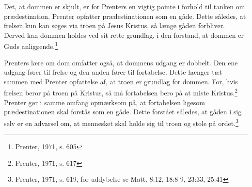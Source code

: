 Det, at dommen er skjult, er for Prenters en vigtig pointe i forhold til tanken om prædestination. Prenter opfatter prædestinationen som en gåde. Dette således, at frelsen kun kan søges via troen på Jesus Kristus, så længe gåden forbliver. Derved kan dommen holdes ved sit rette grundlag, i den forstand, at dommen er Guds anliggende.\footnote{Prenter, 1971, s. 605}

Prenters lære om dom omfatter også, at dommens udgang er dobbelt. Den ene udgang fører til frelse og den anden fører til fortabelse. Dette hænger tæt sammen med Prenter opfattelse af, at troen er grundlag for dommen. For, hvis frelsen beror på troen på Kristus, så må fortabelsen bero på at miste Kristus.\footnote{Prenter, 1971, s. 617} Prenter gør i samme omfang opmærksom på, at fortabelsen ligesom prædestinationen skal forstås som en gåde. Dette forstået således, at gåden i sig selv er en advarsel om, at mennesket skal holde sig til troen og stole på ordet.\footnote{Prenter, 1971, s. 619, for uddybelse se Matt. 8:12, 18:8-9, 23:33, 25:41 }